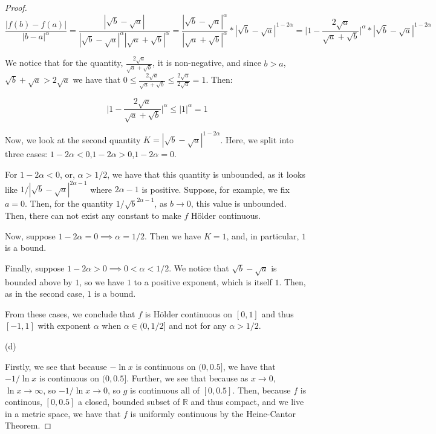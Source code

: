 \documentclass[10pt]{article}
\begin{document}
\begin{proof}[Proof]
$$ \frac{|f(b) - f(a)|}{|b-a|^{\alpha}} = \frac{|\sqrt{b} - \sqrt{a}|}{|\sqrt{b} - \sqrt{a}|^\alpha|\sqrt{a} +\sqrt{b}|^\alpha} = \frac{|\sqrt{b} - \sqrt{a}|^\alpha}{|\sqrt{a} +\sqrt{b}|^\alpha} * |\sqrt{b} - \sqrt{a}| ^{1-2\alpha} = \Big| 1 - \frac{2\sqrt{a}}{\sqrt{a} + \sqrt{b}}\Big|^{\alpha}  * |\sqrt{b} - \sqrt{a}| ^{1-2\alpha} $$

We notice that for the quantity, $\frac{2\sqrt{a}}{\sqrt{a} + \sqrt{b}}$, it is non-negative, and since $b > a$, $\sqrt{b}+ \sqrt{a} > 2\sqrt{a}$ we have that $0 \leq \frac{2\sqrt{a}}{\sqrt{a} + \sqrt{b}} \leq \frac{2\sqrt{a}}{2\sqrt{a}} = 1$. Then:

$$ \Big| 1 - \frac{2\sqrt{a}}{\sqrt{a} + \sqrt{b}}\Big|^{\alpha} \leq |1|^\alpha  = 1 $$

Now, we look at the second quantity $K =|\sqrt{b} - \sqrt{a}| ^{1-2\alpha}$. Here, we split into three cases: $1-2\alpha < 0$,$1-2\alpha > 0$,$1-2\alpha = 0$.

For $1-2\alpha<0$, or, $\alpha > 1/2$, we have that this quantity is unbounded, as it looks like $1/|\sqrt{b} - \sqrt{a}| ^{2\alpha - 1}$ where $2\alpha - 1$ is positive. Suppose, for example, we fix $ a = 0$. Then, for the quantity  $1/\sqrt{b} ^{2\alpha - 1}$, as $b \rightarrow 0$, this value is unbounded. Then, there can not exist any constant to make $f$  H\"{o}lder continuous.

Now, suppose $1-2\alpha = 0 \implies \alpha = 1/2$. Then we have $K = 1$, and, in particular, $1$ is a bound.

Finally, suppose $1 - 2\alpha > 0 \implies 0 < \alpha < 1/2$. We notice that $\sqrt{b} - \sqrt{a}$ is bounded above by $1$, so we have $1$ to a positive exponent, which is itself $1$. Then, as in the second case, $1$ is a bound.

From these cases, we conclude that $f$ is  H\"{o}lder continuous on $[0,1]$ and thus $[-1,1]$ with exponent $\alpha$ when $\alpha \in (0,1/2]$ and not for any $\alpha > 1/2$.

(d)

Firstly, we see that because $-\ln x$ is continuous on $(0,0.5]$, we have that $-1/\ln x$ is continuous on $(0,0.5]$. Further, we see that because as $x \rightarrow 0$, $\ln x \rightarrow \infty$, so $-1/\ln x \rightarrow 0$, so $g$ is continuous all of $[0,0.5]$. Then, because $f$ is continous, $[0,0.5]$ a closed, bounded subset of $\mathbb{R}$ and thus compact, and we live in a metric space, we have that $f$ is uniformly continuous by the Heine-Cantor Theorem.


\end{proof}
\end{document}
